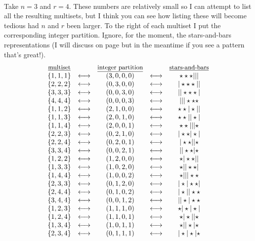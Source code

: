 \documentclass[12pt]{article}
\begin{document}
\label{starsbarsillustration}\\
Take $n=3$ and $r=4$.  These numbers are relatively small so I can attempt to list all the resulting multisets, but I think you can see
how listing these will become tedious had $n$ and $r$ been larger.  To the right of each multiset I put the corresponding integer partition.
Ignore, for the moment, the stars-and-bars representations (I will discuss on page \pageref{starsbarsremark} but in the meantime if you see a pattern that's great!).
$$\begin{array}{ccccc}\underline{\mbox{\small multiset}} &  & \underline{\mbox{\small integer partition}} &  & \underline{\mbox{\small stars-and-bars}}\\
\{1,1,1\} &\longleftrightarrow & (3,0,0,0) &\longleftrightarrow &\star\star\star|||\\
\{2,2,2\} &\longleftrightarrow & (0,3,0,0) &\longleftrightarrow &|\star\star\star||\\
\{3,3,3\} &\longleftrightarrow & (0,0,3,0) &\longleftrightarrow &||\star\star\star|\\
\{4,4,4\} &\longleftrightarrow & (0,0,0,3) &\longleftrightarrow &|||\star\star\star\\
\{1,1,2\} &\longleftrightarrow & (2,1,0,0) &\longleftrightarrow &\star\star|\star||\\
\{1,1,3\} &\longleftrightarrow & (2,0,1,0) &\longleftrightarrow &\star\star||\star|\\
\{1,1,4\} &\longleftrightarrow & (2,0,0,1) &\longleftrightarrow &\star\star|||\star\\
\{2,2,3\} &\longleftrightarrow & (0,2,1,0) &\longleftrightarrow &|\star\star|\star|\\
\{2,2,4\} &\longleftrightarrow & (0,2,0,1) &\longleftrightarrow &|\star\star||\star\\
\{3,3,4\} &\longleftrightarrow & (0,0,2,1) &\longleftrightarrow &||\star\star|\star\\
\{1,2,2\} &\longleftrightarrow & (1,2,0,0) &\longleftrightarrow &\star|\star\star||\\
\{1,3,3\} &\longleftrightarrow & (1,0,2,0) &\longleftrightarrow &\star||\star\star|\\
\{1,4,4\} &\longleftrightarrow & (1,0,0,2) &\longleftrightarrow &\star|||\star\star\\
\{2,3,3\} &\longleftrightarrow & (0,1,2,0) &\longleftrightarrow &|\star|\star\star|\\
\{2,4,4\} &\longleftrightarrow & (0,1,0,2) &\longleftrightarrow &|\star||\star\star\\
\{3,4,4\} &\longleftrightarrow & (0,0,1,2) &\longleftrightarrow &||\star|\star\star\\
\{1,2,3\} &\longleftrightarrow & (1,1,1,0) &\longleftrightarrow &\star|\star|\star|\\
\{1,2,4\} &\longleftrightarrow & (1,1,0,1) &\longleftrightarrow &\star|\star||\star\\
\{1,3,4\} &\longleftrightarrow & (1,0,1,1) &\longleftrightarrow &\star||\star|\star\\
\{2,3,4\} &\longleftrightarrow & (0,1,1,1) &\longleftrightarrow &|\star|\star|\star\end{array}$$
\end{document}

